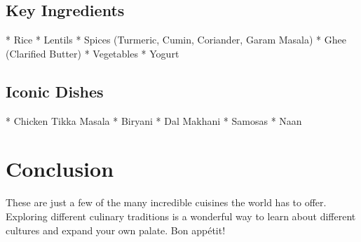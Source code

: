 \documentclass{article}
\begin{document}
\subsection{Key Ingredients}

*   Rice
*   Lentils
*   Spices (Turmeric, Cumin, Coriander, Garam Masala)
*   Ghee (Clarified Butter)
*   Vegetables
*   Yogurt

\subsection{Iconic Dishes}

*   Chicken Tikka Masala
*   Biryani
*   Dal Makhani
*   Samosas
*   Naan

\section{Conclusion}

These are just a few of the many incredible cuisines the world has to offer.  Exploring different culinary traditions is a wonderful way to learn about different cultures and expand your own palate.  Bon appétit!
\end{document}

